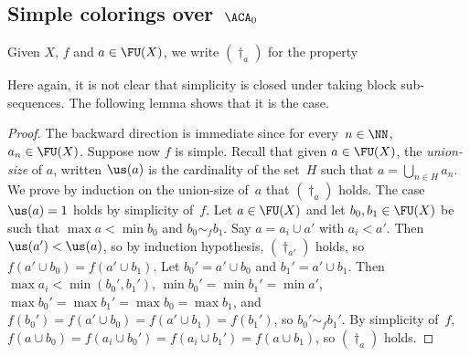 \documentclass{article}
\numberwithin{theorem}{section}
\newtheorem{lemma}[theorem]{Lemma}
\begin{document}
\subsection{Simple colorings over~$\ACA_0$}

Given $X$, $f$ and $a \in \FU(X)$, we write $(\dagger_a)$ for the property 
\begin{quote}
\end{quote}

Here again, it is not clear that simplicity is closed under taking block sub-sequences.
The following lemma shows that it is the case.

\begin{proof}
The backward direction is immediate since for every~$n \in \NN$, $a_n \in \FU(X)$.
Suppose now $f$ is simple. Recall that given $a \in \FU(X)$, the \emph{union-size} of $a$, written $\us(a)$ is the cardinality of the set~$H$ such that $a = \bigcup_{n \in H} a_n$. We prove by induction on the union-size of~$a$ that $(\dagger_{a})$ holds. The case $\us(a) = 1$ holds by simplicity of~$f$. Let $a \in \FU(X)$ and let $b_0, b_1 \in \FU(X)$ be such that $\max a < \min b_0$ and $b_0 \sim_f b_1$. Say $a = a_i \cup a'$ with $a_i < a'$.
Then $\us(a') < \us(a)$, so by induction hypothesis, $(\dagger_{a'})$ holds, so $f(a' \cup b_0) = f(a' \cup b_1)$.
Let $b_0' = a' \cup b_0$ and $b_1' = a' \cup b_1$. Then $\max a_i < \min(b_0',b_1')$, $\min b_0' = \min b_1' = \min a'$, $\max b_0' = \max b_1'=  \max b_0 = \max b_1$, and $f(b_0') = f(a' \cup b_0) = f(a' \cup b_1) = f(b_1')$, so $b_0' \sim_f b_1'$. By simplicity of~$f$, $f(a \cup b_0) = f(a_i \cup b_0') = f(a_i \cup b_1') = f(a \cup b_1)$, so $(\dagger_a)$ holds. 
\end{proof}
\end{document}

